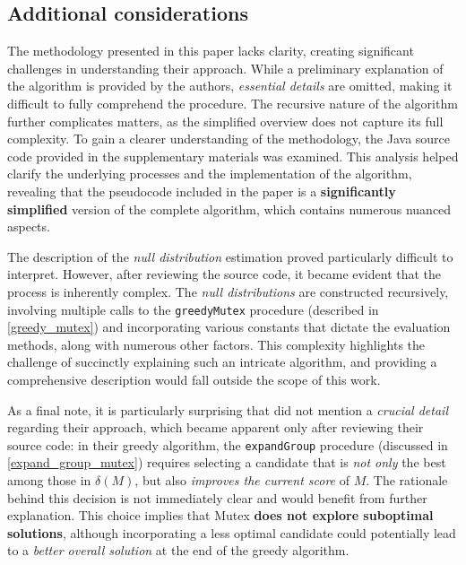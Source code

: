 \subsection{Additional considerations}

The methodology presented in this paper lacks clarity, creating significant challenges in understanding their approach. While a preliminary explanation of the algorithm is provided by the authors, \textit{essential details} are omitted, making it difficult to fully comprehend the procedure. The recursive nature of the algorithm further complicates matters, as the simplified overview does not capture its full complexity. To gain a clearer understanding of the methodology, the Java source code provided in the supplementary materials was examined. This analysis helped clarify the underlying processes and the implementation of the algorithm, revealing that the pseudocode included in the paper is a \textbf{significantly simplified} version of the complete algorithm, which contains numerous nuanced aspects.

The description of the \textit{null distribution} estimation proved particularly difficult to interpret. However, after reviewing the source code, it became evident that the process is inherently complex. The \textit{null distributions} are constructed recursively, involving multiple calls to the \texttt{greedyMutex} procedure (described in \cref{greedy_mutex}) and incorporating various constants that dictate the evaluation methods, along with numerous other factors. This complexity highlights the challenge of succinctly explaining such an intricate algorithm, and providing a comprehensive description would fall outside the scope of this work.

As a final note, it is particularly surprising that \textcite{mutex} did not mention a \textit{crucial detail} regarding their approach, which became apparent only after reviewing their source code: in their greedy algorithm, the \texttt{expandGroup} procedure (discussed in \cref{expand_group_mutex}) requires selecting a candidate that is \textit{not only} the best among those in $\delta(M)$, but also \textit{improves the current score} of $M$. The rationale behind this decision is not immediately clear and would benefit from further explanation. This choice implies that Mutex \textbf{does not explore suboptimal solutions}, although incorporating a less optimal candidate could potentially lead to a \textit{better overall solution} at the end of the greedy algorithm.


